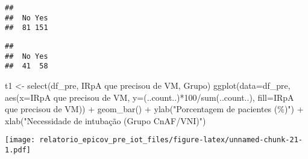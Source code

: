 \documentclass[
]{article}
\newenvironment{Shaded}{\begin{snugshade}}{\end{snugshade}}
\newcommand{\AttributeTok}[1]{\textcolor[rgb]{0.77,0.63,0.00}{#1}}
\newcommand{\DecValTok}[1]{\textcolor[rgb]{0.00,0.00,0.81}{#1}}
\newcommand{\FunctionTok}[1]{\textcolor[rgb]{0.00,0.00,0.00}{#1}}
\newcommand{\NormalTok}[1]{#1}
\newcommand{\OtherTok}[1]{\textcolor[rgb]{0.56,0.35,0.01}{#1}}
\newcommand{\SpecialCharTok}[1]{\textcolor[rgb]{0.00,0.00,0.00}{#1}}
\newcommand{\StringTok}[1]{\textcolor[rgb]{0.31,0.60,0.02}{#1}}
\begin{document}
\begin{Shaded}
\end{Shaded}

\begin{verbatim}
## 
##  No Yes 
##  81 151
\end{verbatim}

\begin{Shaded}
\end{Shaded}

\begin{verbatim}
## 
##  No Yes 
##  41  58
\end{verbatim}

\begin{Shaded}
\begin{Highlighting}[]
\NormalTok{t1 }\OtherTok{\textless{}{-}} \FunctionTok{select}\NormalTok{(df\_pre, }\StringTok{\textasciigrave{}}\AttributeTok{IRpA que precisou de VM}\StringTok{\textasciigrave{}}\NormalTok{, Grupo)}
\FunctionTok{ggplot}\NormalTok{(}\AttributeTok{data=}\NormalTok{df\_pre, }\FunctionTok{aes}\NormalTok{(}\AttributeTok{x=}\StringTok{\textasciigrave{}}\AttributeTok{IRpA que precisou de VM}\StringTok{\textasciigrave{}}\NormalTok{, }\AttributeTok{y=}\NormalTok{(..count..)}\SpecialCharTok{*}\DecValTok{100}\SpecialCharTok{/}\FunctionTok{sum}\NormalTok{(..count..), }\AttributeTok{fill=}\StringTok{\textasciigrave{}}\AttributeTok{IRpA que precisou de VM}\StringTok{\textasciigrave{}}\NormalTok{)) }\SpecialCharTok{+}
  \FunctionTok{geom\_bar}\NormalTok{() }\SpecialCharTok{+}
  \FunctionTok{ylab}\NormalTok{(}\StringTok{"Porcentagem de pacientes (\%)"}\NormalTok{) }\SpecialCharTok{+}
  \FunctionTok{xlab}\NormalTok{(}\StringTok{"Necessidade de intubação (Grupo CnAF/VNI)"}\NormalTok{)}
\end{Highlighting}
\end{Shaded}

\texttt{[image: relatorio\_epicov\_pre\_iot\_files/figure-latex/unnamed-chunk-21-1.pdf]}
\end{document}
